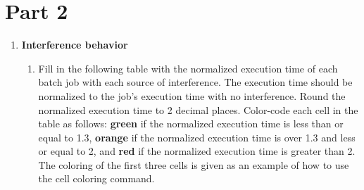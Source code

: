 \section*{Part 2}

\begin{enumerate}
 
    \item \textbf{Interference behavior}
    \begin{enumerate}


        \item Fill in the following table with the normalized execution time of each batch job with each source of interference. The execution time should be normalized to the job’s execution time with no interference. Round the normalized execution time to 2 decimal places. Color-code each cell in the table as follows: {\color{Green}\textbf{green}} if the normalized execution time is less than or equal to 1.3, {\color{YellowOrange}\textbf{orange}} if the normalized execution time is over 1.3 and less or equal to 2, and {\color{Red}\textbf{red}} if the normalized execution time is greater than 2. The coloring of the first three cells is given as an example of how to use the cell coloring command.   


\end{enumerate}
\end{enumerate}
